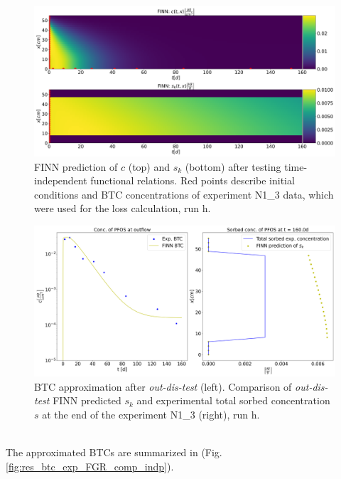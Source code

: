 \begin{figure}[h!]
	\centering
	\includegraphics[width=\textwidth]{images/res_ov_exp_FGR_test_indp.png}
\caption[FINN predicted solution after testing, run h]{FINN prediction of $c$ (top) and $s_k$ (bottom) after testing time-independent functional relations. Red points describe initial conditions and BTC concentrations of experiment N1\_3 data, which were used for the loss calculation, run h.}
\label{fig:res_ov_exp_FGR_test_indp}
\end{figure}
\begin{figure}[h!]
	\centering
	\includegraphics[width=\textwidth]{images/res_btc_exp_FGR_test_indp.png}
\caption[FINN predicted BTC after testing, run h]{BTC approximation after \textit{out-dis-test} (left). Comparison of \textit{out-dis-test} FINN predicted $s_k$ and experimental total sorbed concentration $s$ at the end of the experiment N1\_3 (right), run h.}
\label{fig:res_btc_exp_FGR_test_indp}
\end{figure}\\
The approximated BTCs are summarized in (Fig. \ref{fig:res_btc_exp_FGR_comp_indp}).
